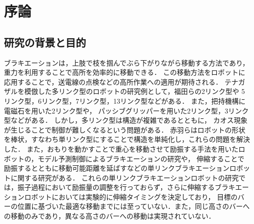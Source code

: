 \chapter[序論]%
        {序論}
        \section{研究の背景と目的}

          ブラキエーションは，上肢で枝を掴んでぶら下がりながら移動する方法であり，重力を利用することで高所を効率的に移動できる．
          この移動方法をロボットに応用することで\cite{福田敏男1990ブラキエーション形移動ロボットの研究}，送電線の点検などの高所作業への適用が期待される．
          テナガザルを模倣した多リンク型のロボットの研究例として，福田らの2リンク型\cite{福田敏男1991ブラキエーション形移動ロボットの研究2}\cite{福田敏男1992ブラキエーション形移動ロボットの研究}\cite{齋藤史倫1993ブラキエーション形移動ロボットの研究}\cite{齋藤史倫1995学習とロボット}\cite{福田敏男1996強化学習法を用いたファジィコントローラの生成}\cite{中西淳1998解析的手法による}\cite{中西淳19992}\cite{中西淳2001ハイブリッドコントローラによる}や
          5リンク型\cite{福田敏男1991ブラキエーション形移動ロボットの研究}，6リンク型\cite{福田敏男1990ブラキエーション形移動ロボットの研究}，7リンク型\cite{齋藤史倫1994ブラキエーション形移動ロボットの研究}，13リンク型\cite{長谷川泰久2001ブラキエーション形移動ロボットの研究}などがある．
          また，把持機構に電磁石を用いた2リンク型\cite{山川雄司2016ブラキエーションロボットの開発と運動生成}\cite{山川雄司2016-2ブラキエーションロボットの開発と運動生成}や，
          パッシブグリッパーを用いた2リンク型\cite{javadi2023acromonk}，3リンク型\cite{grama2024ricmonk}などがある．
          しかし，多リンク型は構造が複雑であるとともに，
          カオス現象\cite{鈴木三男2000二重振り子におけるカオス的振舞}が生じることで制御が難しくなるという問題がある．
          赤羽らはロボットの形状を棒状，すなわち単リンク型にすることで構造を単純化し，これらの問題を解決した\cite{akahane2022single}．
          また，おもりを動かすことで重心を移動させて励振する手法\cite{lieskovsky2023optimal}を用いたロボットの，モデル予測制御によるブラキエーションの研究\cite{Hijiri:Robomech2024-1}や，
          伸縮することで励振するとともに移動可能距離を延ばす\cite{Hijiri:Robomech2024}などの単リンクブラキエーションロボットに関する研究がある．
          これらの単リンクブラキエーションロボットの研究では，振子過程において励振量の調整を行っておらず，さらに伸縮するブラキエーションロボットにおいては実験的に伸縮タイミングを決定しており，
          目標のバーの位置に基づいた最適な移動までには至っていない．また，同じ高さのバーへの移動のみであり，異なる高さのバーへの移動は実現されていない．
          
